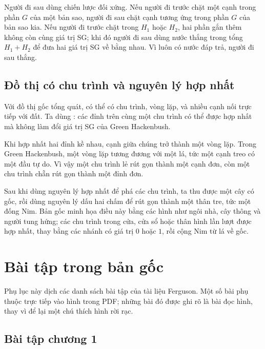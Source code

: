 \documentclass[11pt]{article}
\begin{document}
Người đi sau dùng chiến lược đối xứng. Nếu người đi trước chặt một cạnh trong
phần \(G\) của một bản sao, người đi sau chặt cạnh tương ứng trong phần \(G\)
của bản sao kia. Nếu người đi trước chặt trong \(H_1\) hoặc \(H_2\), hai phần
gắn thêm không còn cùng giá trị SG; khi đó người đi sau dùng nước thắng trong
tổng \(H_1+H_2\) để đưa hai giá trị SG về bằng nhau. Vì luôn có nước đáp trả,
người đi sau thắng.

\subsection{Đồ thị có chu trình và nguyên lý hợp nhất}

Với đồ thị gốc tổng quát, có thể có chu trình, vòng lặp, và nhiều cạnh nối
trực tiếp với đất. Ta dùng : các đỉnh trên cùng một
chu trình có thể được hợp nhất mà không làm đổi giá trị SG của Green
Hackenbush.

Khi hợp nhất hai đỉnh kề nhau, cạnh giữa chúng trở thành một vòng lặp. Trong
Green Hackenbush, một vòng lặp tương đương với một lá, tức một cạnh treo có
một đầu tự do. Vì vậy một chu trình lẻ rút gọn thành một cạnh đơn, còn một
chu trình chẵn rút gọn thành một đỉnh đơn.

Sau khi dùng nguyên lý hợp nhất để phá các chu trình, ta thu được một cây có
gốc, rồi dùng nguyên lý dấu hai chấm để rút gọn thành một thân tre, tức một
đống Nim. Bản gốc minh họa điều này bằng các hình như ngôi nhà, cây thông và
người tung hứng; các chu trình trong cửa, cửa sổ hoặc thân hình lần lượt được
hợp nhất, thay bằng các nhánh có giá trị \(0\) hoặc \(1\), rồi cộng Nim từ lá
về gốc.

\appendix
\section{Bài tập trong bản gốc}

Phụ lục này dịch các danh sách bài tập của tài liệu Ferguson. Một số bài phụ
thuộc trực tiếp vào hình trong PDF; những bài đó được ghi rõ là bài đọc hình,
thay vì để lại một chú thích hình rời rạc.

\subsection{Bài tập chương 1}
\end{document}
